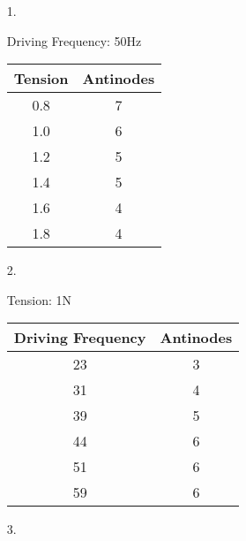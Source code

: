\documentclass[10pt, letterpaper]{article}
\begin{document}
    \begin{itemize}
        \item [1.]\mbox{}
        
        \begin{center}
            Driving Frequency: 50Hz
    
            \begin{tabular}{| c | c |}
                \hline
                Tension & Antinodes             \\
                \hline
                0.8&7\\
                \hline
                1.0&6\\
                \hline
                1.2&5\\
                \hline
                1.4&5\\
                \hline
                1.6&4\\
                \hline
                1.8&4\\
                \hline
            \end{tabular}        
        \end{center}

        \item [2.]\mbox{}
        
        \begin{center}
            Tension: 1N
    
            \begin{tabular}{| c | c |}
                \hline
                Driving Frequency & Antinodes   \\
                \hline
                23&3\\
                \hline
                31&4\\
                \hline
                39&5\\
                \hline
                44&6\\
                \hline
                51&6\\
                \hline
                59&6\\
                \hline
            \end{tabular}        
        \end{center}

        \item [3.]
        

\end{itemize}
\end{document}
